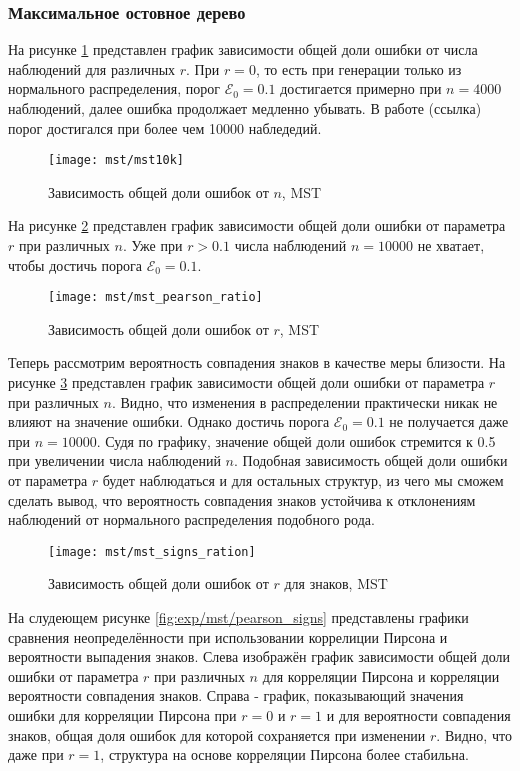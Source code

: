 \subsubsection{Максимальное остовное дерево}

На рисунке \ref{fig:exp/mst/10k} представлен график зависимости общей доли ошибки от числа наблюдений для различных $r$. При $r=0$, то есть при генерации только из нормального распределения, порог $\mathcal{E}_0=0.1$ достигается примерно при $n=4000$ наблюдений, далее ошибка продолжает медленно убывать. В работе (ссылка) порог достигался при более чем 10000 набледедий.

\begin{figure}[H]
\centering
\texttt{[image: mst/mst10k]}
\caption{Зависимость общей доли ошибок от $n$, MST}
\label{fig:exp/mst/10k}
\end{figure}

На рисунке \ref{fig:exp/mst/pearson_ratio} представлен график зависимости общей доли ошибки от параметра $r$ при различных $n$. Уже при $r>0.1$ числа наблюдений $n=10000$ не хватает, чтобы достичь порога $\mathcal{E}_0=0.1$. 

\begin{figure}[H]
\centering
\texttt{[image: mst/mst\_pearson\_ratio]}
\caption{Зависимость общей доли ошибок от $r$, MST}
\label{fig:exp/mst/pearson_ratio}
\end{figure}

Теперь рассмотрим вероятность совпадения знаков в качестве меры близости. На рисунке \ref{fig:exp/mst/mst_signs_ration} представлен график зависимости общей доли ошибки от параметра $r$ при различных $n$. Видно, что изменения в распределении практически никак не влияют на значение ошибки. Однако  достичь порога $\mathcal{E}_0=0.1$ не получается даже при  $n=10000$. Судя по графику, значение общей доли ошибок стремится к 0.5 при увеличении числа наблюдений $n$. Подобная зависимость общей доли ошибки от параметра $r$ будет наблюдаться и для остальных структур, из чего мы сможем сделать вывод, что вероятность совпадения знаков устойчива к отклонениям наблюдений от нормального распределения подобного рода.

\begin{figure}[H]
\centering
\texttt{[image: mst/mst\_signs\_ration]}
\caption{Зависимость общей доли ошибок от $r$ для знаков, MST}
\label{fig:exp/mst/mst_signs_ration}
\end{figure}

На слудеющем рисунке \ref{fig:exp/mst/pearson_signs} представлены графики сравнения неопределённости при использовании коррелиции Пирсона и вероятности выпадения знаков. Слева изображён график зависимости общей доли ошибки от параметра $r$ при различных $n$ для корреляции Пирсона и корреляции вероятности совпадения знаков. Справа - график, показывающий значения ошибки для корреляции Пирсона при $r=0$ и $r=1$ и для вероятности совпадения знаков, общая доля ошибок для которой сохраняется при изменении $r$. Видно, что даже при $r=1$, структура на основе корреляции Пирсона более стабильна.

